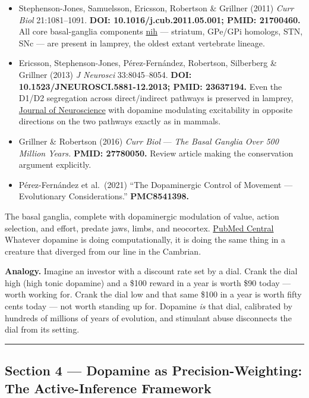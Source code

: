 \begin{itemize}
\tightlist
\item
  Stephenson-Jones, Samuelsson, Ericsson, Robertson \& Grillner (2011) \emph{Curr Biol} 21:1081--1091. \textbf{DOI: 10.1016/j.cub.2011.05.001; PMID: 21700460.} All core basal-ganglia components \href{https://www.ncbi.nlm.nih.gov/pmc/articles/PMC8541398/}{nih} --- striatum, GPe/GPi homologs, STN, SNc --- are present in lamprey, the oldest extant vertebrate lineage.
\item
  Ericsson, Stephenson-Jones, Pérez-Fernández, Robertson, Silberberg \& Grillner (2013) \emph{J Neurosci} 33:8045--8054. \textbf{DOI: 10.1523/JNEUROSCI.5881-12.2013; PMID: 23637194.} Even the D1/D2 segregation across direct/indirect pathways is preserved in lamprey, \href{https://www.jneurosci.org/content/33/18/8045.long}{Journal of Neuroscience} with dopamine modulating excitability in opposite directions on the two pathways exactly as in mammals.
\item
  Grillner \& Robertson (2016) \emph{Curr Biol} --- \emph{The Basal Ganglia Over 500 Million Years.} \textbf{PMID: 27780050.} Review article making the conservation argument explicitly.
\item
  Pérez-Fernández et al.~(2021) ``The Dopaminergic Control of Movement --- Evolutionary Considerations.'' \textbf{PMC8541398.}
\end{itemize}

The basal ganglia, complete with dopaminergic modulation of value, action selection, and effort, predate jaws, limbs, and neocortex. \href{https://pmc.ncbi.nlm.nih.gov/articles/PMC8541398/}{PubMed Central} Whatever dopamine is doing computationally, it is doing the same thing in a creature that diverged from our line in the Cambrian.

\textbf{Analogy.} Imagine an investor with a discount rate set by a dial. Crank the dial high (high tonic dopamine) and a \$100 reward in a year is worth \$90 today --- worth working for. Crank the dial low and that same \$100 in a year is worth fifty cents today --- not worth standing up for. Dopamine \emph{is} that dial, calibrated by hundreds of millions of years of evolution, and stimulant abuse disconnects the dial from its setting.

\begin{center}\rule{0.5\linewidth}{0.5pt}\end{center}

\subsection{Section 4 --- Dopamine as Precision-Weighting: The Active-Inference Framework}\label{01_dopamine_substrate-section-4-dopamine-as-precision-weighting-the-active-inference-framework}

